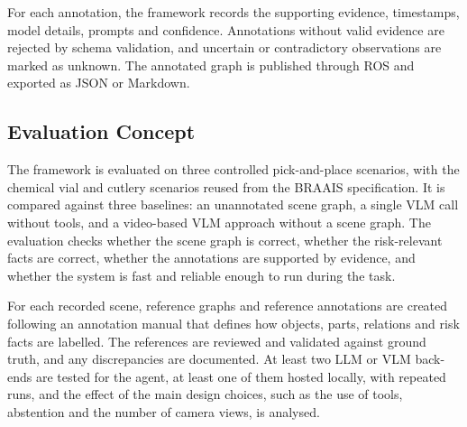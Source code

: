 For each annotation, the framework records the supporting evidence,
timestamps, model details, prompts and confidence. Annotations without
valid evidence are rejected by schema validation, and uncertain or
contradictory observations are marked as unknown. The annotated graph is
published through ROS and exported as JSON or Markdown.

\subsection{Evaluation Concept}
\label{sec:evaluation-concept}

The framework is evaluated on three controlled pick-and-place scenarios,
with the chemical vial and cutlery scenarios reused from the BRAAIS
specification. It is compared against three baselines: an unannotated
scene graph, a single VLM call without tools, and a video-based VLM
approach without a scene graph. The evaluation checks whether the scene
graph is correct, whether the risk-relevant facts are correct, whether the
annotations are supported by evidence, and whether the system is fast and
reliable enough to run during the task.

For each recorded scene, reference graphs and reference annotations are
created following an annotation manual that defines how objects, parts,
relations and risk facts are labelled. The references are reviewed and
validated against ground truth, and any discrepancies are documented. At
least two LLM or VLM back-ends are tested for the agent, at least one of
them hosted locally, with repeated runs, and the effect of the main design
choices, such as the use of tools, abstention and the number of camera
views, is analysed.
